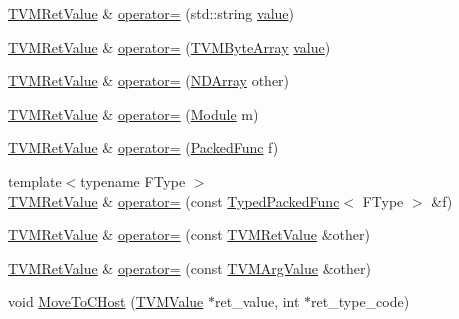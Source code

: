 \begin{DoxyCompactItemize}
\item 
\hyperlink{classtvm_1_1runtime_1_1TVMRetValue}{T\+V\+M\+Ret\+Value} \& \hyperlink{classtvm_1_1runtime_1_1TVMRetValue_a952f62623ec147f366363b664d749566}{operator=} (std\+::string \hyperlink{classtvm_1_1runtime_1_1TVMRetValue_a75696cb65d294217796fbc4f1c22d7f8}{value})
\item 
\hyperlink{classtvm_1_1runtime_1_1TVMRetValue}{T\+V\+M\+Ret\+Value} \& \hyperlink{classtvm_1_1runtime_1_1TVMRetValue_afd42f6574de11e3b62d40509a94f4f9f}{operator=} (\hyperlink{structTVMByteArray}{T\+V\+M\+Byte\+Array} \hyperlink{classtvm_1_1runtime_1_1TVMRetValue_a75696cb65d294217796fbc4f1c22d7f8}{value})
\item 
\hyperlink{classtvm_1_1runtime_1_1TVMRetValue}{T\+V\+M\+Ret\+Value} \& \hyperlink{classtvm_1_1runtime_1_1TVMRetValue_afe5a60e856a30894e795d5230b0a7022}{operator=} (\hyperlink{classtvm_1_1runtime_1_1NDArray}{N\+D\+Array} other)
\item 
\hyperlink{classtvm_1_1runtime_1_1TVMRetValue}{T\+V\+M\+Ret\+Value} \& \hyperlink{classtvm_1_1runtime_1_1TVMRetValue_ad5446f5812132852387dca7335989e88}{operator=} (\hyperlink{classtvm_1_1runtime_1_1Module}{Module} m)
\item 
\hyperlink{classtvm_1_1runtime_1_1TVMRetValue}{T\+V\+M\+Ret\+Value} \& \hyperlink{classtvm_1_1runtime_1_1TVMRetValue_a4ab194932127e4b1c372e5e58e450721}{operator=} (\hyperlink{classtvm_1_1runtime_1_1PackedFunc}{Packed\+Func} f)
\item 
{\footnotesize template$<$typename F\+Type $>$ }\\\hyperlink{classtvm_1_1runtime_1_1TVMRetValue}{T\+V\+M\+Ret\+Value} \& \hyperlink{classtvm_1_1runtime_1_1TVMRetValue_a3eaf85a64828b05e95d57e958089a34d}{operator=} (const \hyperlink{classtvm_1_1runtime_1_1TypedPackedFunc}{Typed\+Packed\+Func}$<$ F\+Type $>$ \&f)
\item 
\hyperlink{classtvm_1_1runtime_1_1TVMRetValue}{T\+V\+M\+Ret\+Value} \& \hyperlink{classtvm_1_1runtime_1_1TVMRetValue_ac87c22e4d49e79ce5b36b3aead667fcb}{operator=} (const \hyperlink{classtvm_1_1runtime_1_1TVMRetValue}{T\+V\+M\+Ret\+Value} \&other)
\item 
\hyperlink{classtvm_1_1runtime_1_1TVMRetValue}{T\+V\+M\+Ret\+Value} \& \hyperlink{classtvm_1_1runtime_1_1TVMRetValue_aafc5d18f0ac508fdd8a90b5af9bc1eff}{operator=} (const \hyperlink{classtvm_1_1runtime_1_1TVMArgValue}{T\+V\+M\+Arg\+Value} \&other)
\item 
void \hyperlink{classtvm_1_1runtime_1_1TVMRetValue_a74ea2767d491c57cb9c71e26ee934344}{Move\+To\+C\+Host} (\hyperlink{unionTVMValue}{T\+V\+M\+Value} $\ast$ret\+\_\+value, int $\ast$ret\+\_\+type\+\_\+code)

\end{DoxyCompactItemize}
